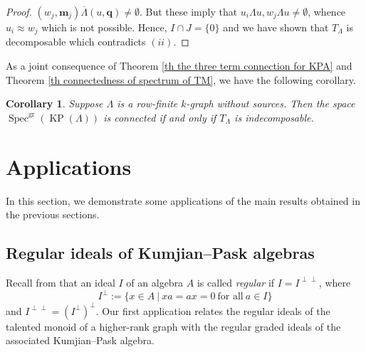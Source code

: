 \documentclass[a4paper,reqno,12pt]{amsart}
\numberwithin{equation}{section}
\newtheorem{cor}[thm]{Corollary}
\theoremstyle{definition}
\theoremstyle{remark}
\newcommand{\Spec}{\operatorname{Spec}}
\newcommand{\gr}{\operatorname{gr}}
\newcommand{\KP}{\operatorname{KP}}
\newcommand{\M}{\mathbf{m}}
\newcommand{\Q}{\mathbf{q}}
\begin{document}
\begin{proof}
$(w_j,\M_j)\overline{\Lambda}(u,\Q)\neq \emptyset$. But these imply that $u_i\Lambda u,w_j\Lambda u\neq \emptyset$, whence $u_i\approx w_j$ which is not possible. Hence, $I\cap J=\{0\}$ and we have shown that $T_\Lambda$ is decomposable which contradicts $(ii)$. 
\end{proof}
As a joint consequence of Theorem \ref{th the three term connection for KPA} and Theorem \ref{th connectedness of spectrum of TM}, we have the following corollary.
\begin{cor}\label{cor prime spectrum of KPA is connected via TM}
Suppose $\Lambda$ is a row-finite $k$-graph without sources. Then the space $\Spec^{\gr}(\KP(\Lambda))$ is connected if and only if $T_\Lambda$ is indecomposable.  
\end{cor}

\section{Applications}\label{sec applications} 
In this section, we demonstrate some applications of the main results obtained in the previous sections. 

\subsection{Regular ideals of Kumjian--Pask algebras} Recall from \cite{RegLPA} that an ideal $I$ of an algebra $A$ is called \emph{regular} if $I=I^{\perp\perp}$, where \[I^\perp:=\{x\in A~|~xa=ax=0~\text{for all}~a\in I\}\] and $I^{\perp\perp}=(I^\perp)^\perp$. Our first application relates the regular ideals of the talented monoid of a higher-rank graph with the regular graded ideals of the associated Kumjian--Pask algebra. 
\end{document}
